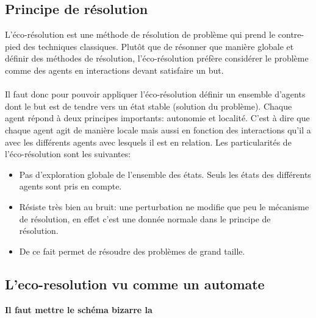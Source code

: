     \subsection{Principe de résolution}
        L'éco-résolution est une méthode de résolution de problème qui prend le contre-pied des techniques classiques. Plutôt que de résonner que manière globale et définir des méthodes de résolution, l'éco-résolution préfère considérer le problème comme des agents en interactions devant satisfaire un but. \\ \\
        Il faut donc pour pouvoir appliquer l'éco-résolution définir un ensemble d'agents dont le but est de tendre vers un état stable (solution du problème). Chaque agent répond à deux principes importants: autonomie et localité. C'est à dire que chaque agent agit de manière locale mais aussi en fonction des interactions qu'il a avec les différents agents avec lesquels il est en relation.
        Les particularités de l'éco-résolution sont les suivantes:
        \begin{itemize}
        \item Pas d'exploration globale de l'ensemble des états. Seuls les états des différents agents sont pris en compte. 
        \item Résiste très bien au bruit: une perturbation ne modifie que peu le mécanisme de résolution, en effet c'est une donnée normale dans le principe de résolution.
        \item De ce fait permet de résoudre des problèmes de grand taille. 
        \end{itemize}
    
        \subsection{L'eco-resolution vu comme un automate}
        \textbf{Il faut mettre le schéma bizarre la }
